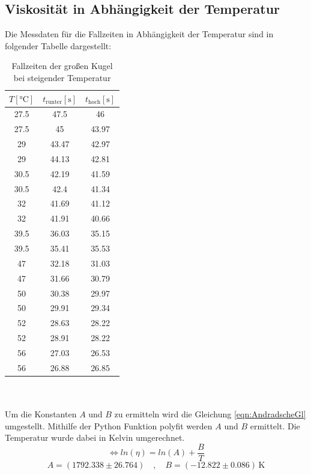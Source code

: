 \subsection{Viskosität in Abhängigkeit der Temperatur}
Die Messdaten für die Fallzeiten in Abhängigkeit der Temperatur sind in folgender Tabelle dargestellt:
\begin{table}[!htp]
  \centering
  \begin{tabular}{c|c|c}
    \toprule
    $T [\unit{\degreeCelsius}]$ & $t_{\text{runter}} [\unit{\second}]$ & $t_{\text{hoch}} [\unit{\second}]$\\
    \midrule
    27.5 & 47.5 & 46\\%
    27.5 & 45 & 43.97\\
    29 & 43.47 & 42.97\\
    29 & 44.13 & 42.81\\
    30.5 & 42.19 & 41.59\\
    30.5 & 42.4 & 41.34\\
    32 & 41.69 & 41.12\\
    32 & 41.91 & 40.66\\
    39.5 & 36.03 & 35.15\\
    39.5 & 35.41 & 35.53\\
    47 & 32.18 & 31.03\\
    47 & 31.66 & 30.79\\
    50 & 30.38 & 29.97\\
    50 & 29.91 & 29.34\\
    52 & 28.63 & 28.22\\
    52 & 28.91 & 28.22\\
    56 & 27.03 & 26.53\\
    56 & 26.88 & 26.85\\
    \bottomrule
  \end{tabular}
  \label{tabellegkt}
  \caption{Fallzeiten der großen Kugel bei steigender Temperatur}
\end{table}
\\
\\
Um die Konstanten $A$ und $B$ zu ermitteln wird die Gleichung \eqref{eqn:AndradscheGl} umgestellt.
Mithilfe der Python Funktion polyfit werden $A$ und $B$ ermittelt. Die Temperatur wurde dabei in Kelvin umgerechnet.
\begin{equation*}
  \Leftrightarrow ln(η) = ln(A) + \frac{B}{T}
\end{equation*}
\begin{equation*}
  A = (1792.338 ± 26.764) \quad , \quad B = (-12.822 ± 0.086)\,\si{\kelvin}
\end{equation*}
